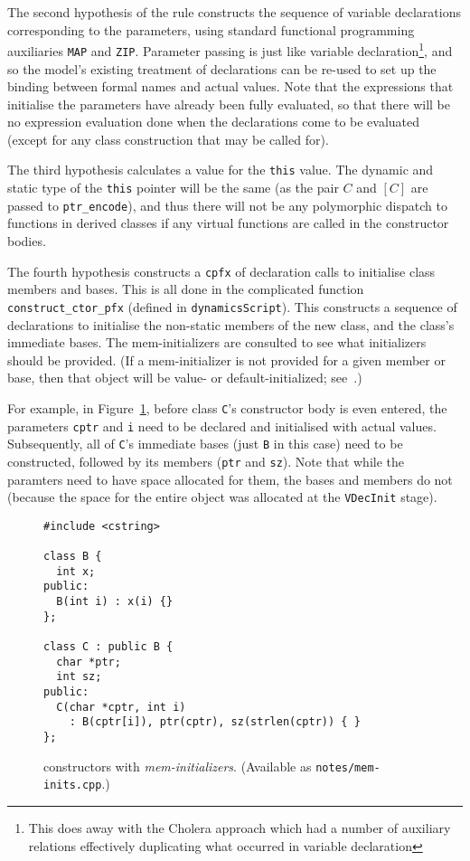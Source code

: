 \documentclass[11pt]{article}
\begin{document}
The second hypothesis of the rule constructs the sequence of variable
declarations corresponding to the parameters, using standard
functional programming auxiliaries \texttt{MAP} and \texttt{ZIP}.
Parameter passing is just like variable declaration\footnote{This does
  away with the \textsf{Cholera} approach which had a number of
  auxiliary relations effectively duplicating what occurred in
  variable declaration}, and so the model's existing treatment of
declarations can be re-used to set up the binding between formal names
and actual values.  Note that the expressions that initialise the
parameters have already been fully evaluated, so that there will be no
expression evaluation done when the declarations come to be evaluated
(except for any class construction that may be called for).

The third hypothesis calculates a value for the \texttt{this} value.
The dynamic and static type of the \texttt{this} pointer will be the
same (as the pair $C$ and $[C]$ are passed to \texttt{ptr_encode}),
and thus there will not be any polymorphic dispatch to functions in
derived classes if any virtual functions are called in the constructor
bodies.

The fourth hypothesis constructs a \texttt{cpfx} of declaration calls
to initialise class members and bases.  This is all done in the
complicated function \texttt{construct_ctor_pfx} (defined in
\texttt{dynamicsScript}).  This constructs a sequence of declarations
to initialise the non-static members of the new class, and the class's
immediate bases.  The mem-initializers are consulted to see what
initializers should be provided.  (If a mem-initializer is not
provided for a given member or base, then that object will be value-
or default-initialized; see~\cite[\S12.6.2, paragraphs
3--4]{cpp-standard-iso14882}.)

For example, in Figure~\ref{fig:mem-inits}, before class \texttt{C}'s
constructor body is even entered, the parameters \texttt{cptr} and
\texttt{i} need to be declared and initialised with actual values.
Subsequently, all of \texttt{C}'s immediate bases (just \texttt{B} in
this case) need to be constructed, followed by its members
(\texttt{ptr} and \texttt{sz}).  Note that while the paramters need to
have space allocated for them, the bases and members do not (because
the space for the entire object was allocated at the \texttt{VDecInit}
stage).

\begin{figure}[htbp]
\begin{verbatim}
#include <cstring>

class B {
  int x;
public:
  B(int i) : x(i) {}
};

class C : public B {
  char *ptr;
  int sz;
public:
  C(char *cptr, int i)
    : B(cptr[i]), ptr(cptr), sz(strlen(cptr)) { }
};
\end{verbatim}
\caption{\cpp{} constructors with \emph{mem-initializers}.  (Available
as \texttt{notes/mem-inits.cpp}.)}
\label{fig:mem-inits}
\end{figure}
\end{document}
